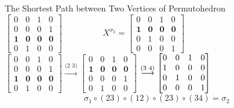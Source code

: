 \documentclass{beamer}
\theoremstyle{plain}
\theoremstyle{definition}
\begin{document}
\begin{frame}{The Shortest Path between Two Vertices of Permutohedron}
    $\begin{bmatrix}
        0 & 0 & 1 & 0 \\ 0 & 0 & 0 & 1  \\ \mathbf{1} & \mathbf{0} & \mathbf{0} & \mathbf{0} \\ 0 & 1 & 0 & 0
        \end{bmatrix} \hspace{2cm} X^{\sigma_2} = \begin{bmatrix}
       0 & 0 & 1 & 0 \\ \mathbf{1} & \mathbf{0} & \mathbf{0} & \mathbf{0} \\ 0 & 1 & 0 & 0 \\ 0 & 0 & 0 & 1
    \end{bmatrix}$ \\ \vspace{0.3cm}
    $\begin{bmatrix}
        0 & 0 & 1 & 0 \\ 0 & 0 & 0 & 1  \\ \mathbf{1} & \mathbf{0} & \mathbf{0} & \mathbf{0} \\ 0 & 1 & 0 & 0
        \end{bmatrix} \stackrel{\text{(2 3)}}{\longrightarrow} \begin{bmatrix}
        0 & 0 & 1 & 0 \\ \mathbf{1} & \mathbf{0} & \mathbf{0} & \mathbf{0} \\ 0 & 0 & 0 & 1 \\ 0 & 1 & 0 & 0
        \end{bmatrix}$ \pause $\stackrel{\text{(3 4)}}{\longrightarrow}
        \begin{bmatrix}
       0 & 0 & 1 & 0 \\ 1 & 0 & 0 & 0 \\ 0 & 1 & 0 & 0 \\ 0 & 0 & 0 & 1
    \end{bmatrix} \vspace{0.3cm}
        $
        \pause 
    $$\sigma_1 \circ (2 3) \circ (1 2) \circ (2 3) \circ (3 4) = \sigma_2$$
\end{frame}
\end{document}
